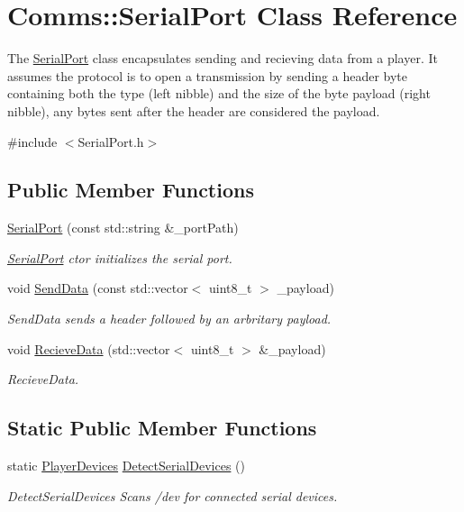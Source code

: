 \hypertarget{classComms_1_1SerialPort}{\section{Comms\-:\-:Serial\-Port Class Reference}
\label{classComms_1_1SerialPort}
}


The \hyperlink{classComms_1_1SerialPort}{Serial\-Port} class encapsulates sending and recieving data from a player. It assumes the protocol is to open a transmission by sending a header byte containing both the type (left nibble) and the size of the byte payload (right nibble), any bytes sent after the header are considered the payload.  




{\ttfamily \#include $<$Serial\-Port.\-h$>$}

\subsection*{Public Member Functions}
\begin{DoxyCompactItemize}
\item 
\hyperlink{classComms_1_1SerialPort_afa01d5ec56ccf54adf49e0e2b827cb0c}{Serial\-Port} (const std\-::string \&\-\_\-port\-Path)
\begin{DoxyCompactList}\small\item\em \hyperlink{classComms_1_1SerialPort}{Serial\-Port} ctor initializes the serial port. \end{DoxyCompactList}\item 
void \hyperlink{classComms_1_1SerialPort_a9045f380b2923237c3201af2c816124f}{Send\-Data} (const std\-::vector$<$ uint8\-\_\-t $>$ \-\_\-payload)
\begin{DoxyCompactList}\small\item\em Send\-Data sends a header followed by an arbritary payload. \end{DoxyCompactList}\item 
void \hyperlink{classComms_1_1SerialPort_ae2040a81a8e920fda477ab9490b3d85a}{Recieve\-Data} (std\-::vector$<$ uint8\-\_\-t $>$ \&\-\_\-payload)
\begin{DoxyCompactList}\small\item\em Recieve\-Data. \end{DoxyCompactList}\end{DoxyCompactItemize}
\subsection*{Static Public Member Functions}
\begin{DoxyCompactItemize}
\item 
static \hyperlink{namespaceComms_ae7f8ecf87c32fe890069143ff75f2885}{Player\-Devices} \hyperlink{classComms_1_1SerialPort_a7e5a8b6b261907fde43b7cafc82ea5fa}{Detect\-Serial\-Devices} ()
\begin{DoxyCompactList}\small\item\em Detect\-Serial\-Devices Scans /dev for connected serial devices. \end{DoxyCompactList}\end{DoxyCompactItemize}
